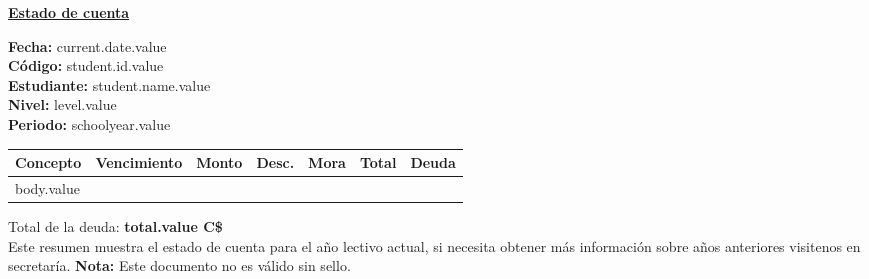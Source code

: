 \documentclass[12pt]{article}
\newcommand{\aDupleLeft}[2]{\textbf{#1}\hspace{2mm} #2 \hfill}
\newcommand{\aDupleRight}[2]{\hfill\textbf{#1}\hspace{2mm} #2}
\newcommand{\levelName}{level.value}
\newcommand{\studentId}{student.id.value}
\newcommand{\studentName}{student.name.value}
\newcommand{\schoolYear}{schoolyear.value}
\newcommand{\currentDate}{current.date.value}
\begin{document}
    \begin{center}
        \underline{\textbf{\Large Estado de cuenta}}
    \end{center}
    \hfill\textbf{Fecha: }\currentDate\\
    \aDupleLeft{Código:}{\studentId}\\
    \aDupleLeft{Estudiante:}{\studentName}\\
    \aDupleRight{Nivel:}{\levelName}\\

    \textbf{Periodo:} \schoolYear
    \begin{table}[H]
        \centering
        \begin{tabular}{ l | r | r | r | r | r || r }
            \hline
            Concepto & Vencimiento & Monto & Desc. & Mora & Total & Deuda \\\hline\hline
            body.value
        \end{tabular}
    \end{table}
    Total de la deuda: \textbf{total.value C\$}\\
    
    Este resumen muestra el estado de cuenta para el año lectivo actual, si necesita obtener más información sobre años 
    anteriores visitenos en secretaría.
    \vfill
    \textbf{Nota:} Este documento no es válido sin sello.
    
\end{document}
